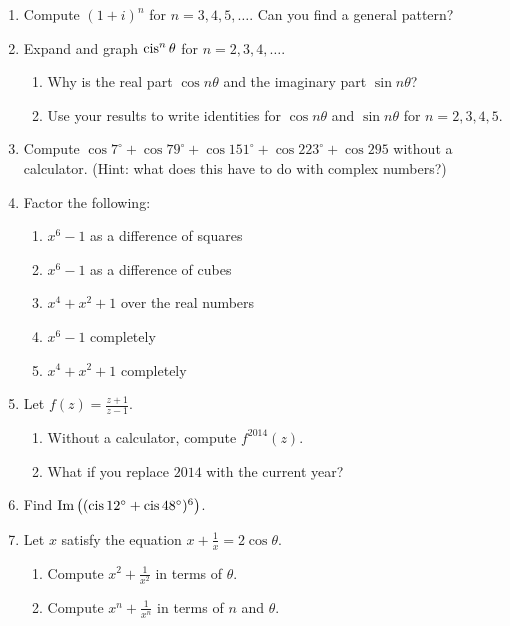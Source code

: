 \documentclass[../gatm.tex]{subfiles}
\begin{document}
\begin{enumerate}
\item Compute $(1+i)^n$ for $n=3,4,5,\ldots$. Can you find a general pattern?
\item Expand and graph $\operatorname{cis}^n \theta$ for $n=2,3,4,\ldots$.

\begin{enumerate}
\item Why is the real part $\cos n\theta$ and the imaginary part $\sin n\theta$?
\item Use your results to write identities for $\cos n\theta$ and $\sin n\theta$ for $n=2,3,4,5$.
\end{enumerate}

\newcommand{\cosdeg}[1] {\cos #1^\circ}

\item Compute $\cosdeg{7} + \cosdeg{79} + \cosdeg{151} + \cosdeg{223} + \cos{295}$ without a calculator. (Hint: what does this have to do with complex numbers?)
\item Factor the following:
\begin{multicols}{2}
\begin{enumerate}
\item $x^6-1$ as a difference of squares
\item $x^6-1$ as a difference of cubes
\item $x^4+x^2+1$ over the real numbers
\item $x^6-1$ completely
\item $x^4+x^2+1$ completely
\end{enumerate}
\end{multicols}

\item Let $f(z)=\frac{z+1}{z-1}$.
\begin{enumerate}
\item Without a calculator, compute $f^{2014}(z)$.
\item What if you replace $2014$ with the current year?
\end{enumerate}

\item Find $\operatorname{Im}\left((\operatorname{cis} 12^\circ + \operatorname{cis} 48^\circ)^6\right)$.

\item Let $x$ satisfy the equation $x+\frac{1}{x}=2\cos\theta$.
\begin{enumerate}
\item Compute $x^2+\frac{1}{x^2}$ in terms of $\theta$.
\item Compute $x^n+\frac{1}{x^n}$ in terms of $n$ and $\theta$.
\end{enumerate}
\end{enumerate}
\end{document}
